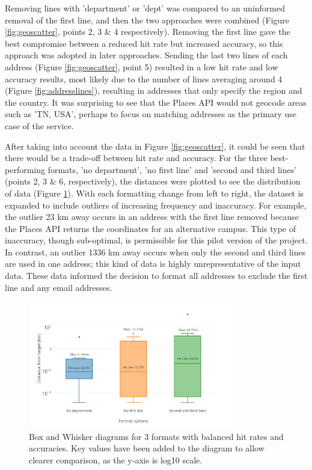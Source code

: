 \documentclass[Report.tex]{subfiles}
\begin{document}
\noindent Removing lines with 'department' or 'dept' was compared to an uninformed removal of the first line, and then the two approaches were combined (Figure \ref{fig:geoscatter}, points 2, 3 \& 4 respectively). Removing the first line gave the best compromise between a reduced hit rate but increased accuracy, so this approach was adopted in later approaches. Sending the last two lines of each address (Figure \ref{fig:geoscatter}, point 5) resulted in a low hit rate and low accuracy results, most likely due to the number of lines averaging around 4 (Figure \ref{fig:addresslines}), resulting in addresses that only specify the region and the country. It was surprising to see that the Places API would not geocode areas such as 'TN, USA', perhaps to focus on matching addresses as the primary use case of the service.\newline

\noindent After taking into account the data in Figure \ref{fig:geoscatter}, it could be seen that there would be a trade-off between hit rate and accuracy. For the three best-performing formats, 'no department', 'no first line' and 'second and third lines' (points 2, 3 \& 6, respectively), the distances were plotted to see the distribution of data (Figure \ref{fig:geoboxes}). With each formatting change from left to right, the dataset is expanded to include outliers of increasing frequency and inaccuracy. For example, the outlier 23 km away occurs in an address with the first line removed because the Places API returns the coordinates for an alternative campus. This type of inaccuracy, though sub-optimal, is permissible for this pilot version of the project. In contrast, an outlier 1336 km away occurs when only the second and third lines are used in one address; this kind of data is highly unrepresentative of the input data. These data informed the decision to format all addresses to exclude the first line and any email addresses.

\begin{figure}[!ht]
\begin{center}
	\includegraphics[width=0.8\textwidth]{../lib/images/distance-boxes}
	\caption{Box and Whisker diagrams for 3 formats with balanced hit rates and accuracies. Key values have been added to the diagram to allow clearer comparison, as the y-axis is log10 scale.\label{fig:geoboxes}}
\end{center}
\end{figure}
\end{document}

